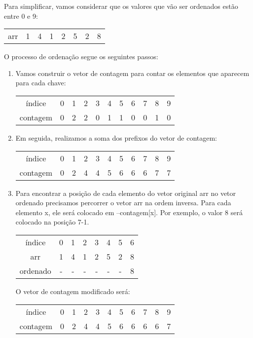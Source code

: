 \begin{exemplo}

Para simplificar, vamos considerar que os valores que vão ser ordenados estão entre 0 e 9:

\begin{tabular}{cccccccc}
arr     &  1 & 4 & 1 & 2 & 5 & 2 & 8\\
\end{tabular}

O processo de ordenação segue os seguintes passos:

\begin{enumerate}

\item Vamos construir o vetor de contagem para contar os elementos que aparecem para cada chave:

\begin{tabular}{ccccccccccc}
índice     &  0 & 1 & 2 & 3 & 4 & 5 & 6 & 7 & 8 & 9\\
contagem   &  0 & 2 & 2 & 0 & 1 & 1 & 0 & 0 & 1 & 0\\
\end{tabular}

\item Em seguida, realizamos a soma dos prefixos do vetor de contagem:

\begin{tabular}{ccccccccccc}
índice     &  0 & 1 & 2 & 3 & 4 & 5 & 6 & 7 & 8 & 9\\
contagem   &  0 & 2 & 4 & 4 & 5 & 6 & 6 & 6 & 7 & 7\\
\end{tabular}


\item Para encontrar a posição de cada elemento do vetor original arr no vetor ordenado precisamos percorrer o vetor arr na ordem inversa. Para cada elemento x, ele será colocado em --contagem[x]. Por exemplo, o valor 8 será colocado na posição 7-1.


\begin{tabular}{cccccccc}
índice   & 0  & 1 & 2 & 3 & 4 & 5 & 6\\
arr      &  1 & 4 & 1 & 2 & 5 & 2 & 8\\
ordenado &  - & - & - & - & - & - & 8\\ 
\end{tabular}

O vetor de contagem modificado será:

\begin{tabular}{ccccccccccc}
índice     &  0 & 1 & 2 & 3 & 4 & 5 & 6 & 7 & 8 & 9\\
contagem   &  0 & 2 & 4 & 4 & 5 & 6 & 6 & 6 & 6 & 7\\
\end{tabular}


\end{enumerate}
\end{exemplo}

